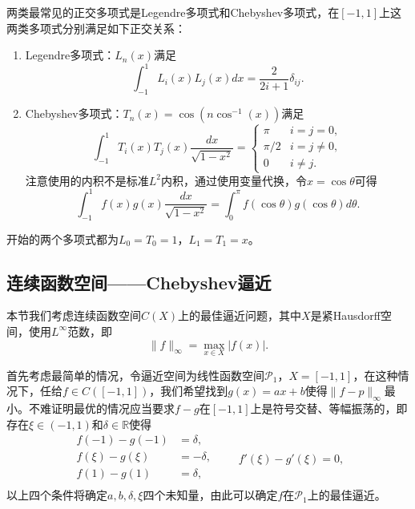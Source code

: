 \documentclass[a4paper,10pt]{ctexart}
\begin{document}
两类最常见的正交多项式是Legendre多项式和Chebyshev多项式，在$ [-1,1] $上这两类多项式分别满足如下正交关系：
\begin{enumerate}
    \item Legendre多项式：$ L_n(x) $满足
    \begin{equation}
        \int_{-1}^{1} L_i(x)L_j(x)dx = \frac{2}{2i+1}\delta_{ij}.
    \end{equation}
    \item Chebyshev多项式：$ T_n(x) = \cos(n \cos^{-1}(x)) $满足
    \begin{equation}
        \int_{-1}^{1} T_i(x)T_j(x)\frac{dx}{\sqrt{1-x^2}} = 
        \begin{cases}
            \pi & i=j=0,\\
            \pi/2 & i=j\ne 0,\\
            0 & i\ne j.
        \end{cases}
    \end{equation}
    注意使用的内积不是标准$ L^2 $内积，通过使用变量代换，令$ x=\cos \theta $可得
    \[
        \int_{-1}^{1} f(x)g(x) \frac{dx}{\sqrt{1-x^2}} = \int_{0}^{\pi} f(\cos \theta)g(\cos \theta)d\theta.
    \]
\end{enumerate}
开始的两个多项式都为$ L_0=T_0=1 $，$ L_1=T_1=x $。

\subsection{连续函数空间——Chebyshev逼近}
本节我们考虑连续函数空间$ C(X) $上的最佳逼近问题，其中$ X $是紧Hausdorff空间，使用$ L^\infty $范数，即
\begin{equation}
    \| f \|_\infty = \max_{x\in X} |f(x)|.
\end{equation}

首先考虑最简单的情况，令逼近空间为线性函数空间$ \mathcal{P}_1 $，$ X=[-1,1] $，在这种情况下，任给$ f\in C([-1,1]) $，我们希望找到$ g(x) = ax+b $使得$ \| f-p \|_\infty $最小。不难证明最优的情况应当要求$ f-g $在$ [-1,1] $上是符号交替、等幅振荡的，即存在$ \xi\in (-1,1) $和$ \delta\in \mathbb{R} $使得
\[
    \begin{aligned}
        f(-1) - g(-1) &=\delta,\\
        f(\xi) - g(\xi) &= -\delta,\\
        f(1) - g(1) &= \delta,\\
    \end{aligned}\qquad f'(\xi) - g'(\xi) = 0,
\]
以上四个条件将确定$ a,b,\delta, \xi $四个未知量，由此可以确定$ f $在$ \mathcal{P}_1 $上的最佳逼近。
\end{document}
